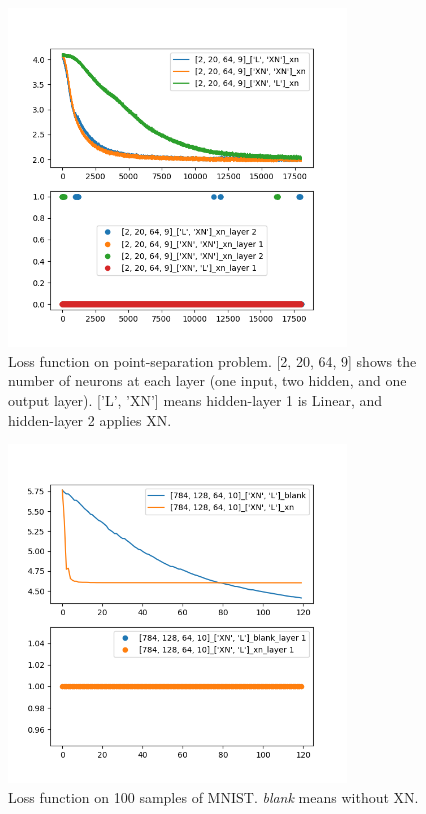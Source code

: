 \begin{enumerate}
	\begin{figure}[H]
		\center
		\includegraphics*[width=0.8\textwidth]{./figures/XNv2_Points.png}
		\caption{Loss function on point-separation problem. [2, 20, 64, 9] shows the number of neurons at each layer (one input, two hidden, and one output layer). ['L', 'XN'] means hidden-layer 1 is Linear, and hidden-layer 2 applies XN.}
		\label{XNv2_Points}
	\end{figure}
	\begin{figure}[H]
		\center
		\includegraphics*[width=0.8\textwidth]{./figures/XNv2_mnist100.png}
		\caption{Loss function on 100 samples of MNIST. \emph{blank} means without XN.}
		\label{XNv2_Points}
	\end{figure}
	

\end{enumerate}
